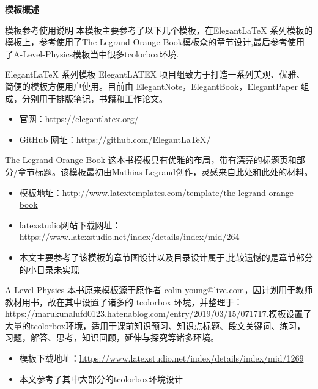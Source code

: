 
\frontmatter
\thispagestyle{empty}
\newpage
\begin{center}
	\textbf{\LARGE 模板概述}
\end{center}
\begin{ascolorbox5}{模板参考使用说明}
本模板主要参考了以下几个模板，在Elegant\LaTeX{} 系列模板的模板上，参考使用了The Legrand Orange Book模板众的章节设计,最后参考使用了A-Level-Physics模板当中很多tcolorbox环境.
\begin{ascboxB}{Elegant\LaTeX{} 系列模板}
ElegantLATEX 项目组致力于打造一系列美观、优雅、简便的模板方便用户使用。目前由
ElegantNote，ElegantBook，ElegantPaper 组成，分别用于排版笔记，书籍和工作论文。
\begin{itemize}
	\item 官网：\href{https://elegantlatex.org/}{https://elegantlatex.org/}
	\item GitHub 网址：\href{https://github.com/ElegantLaTeX/}{https://github.com/ElegantLaTeX/}
\end{itemize} 
\end{ascboxB}
\begin{ascboxB}{The Legrand Orange Book}
这本书模板具有优雅的布局，带有漂亮的标题页和部分/章节标题。该模板最初由Mathias Legrand创作，灵感来自此处和此处的材料。
\begin{itemize}
\item  模板地址：\href{http://www.latextemplates.com/template/the-legrand-orange-book}{http://www.latextemplates.com/template/the-legrand-orange-book}
\item  latexstudio网站下载网址：\href{https://www.latexstudio.net/index/details/index/mid/264}{https://www.latexstudio.net/index/details/index/mid/264}
\item 本文主要参考了该模板的章节图设计以及目录设计属于,比较遗憾的是章节部分的小目录未实现
\end{itemize} 
\end{ascboxB}
\begin{ascboxB}{A-Level-Physics}
本书原来模板源于原作者  \url{colin-young@live.com}，因计划用于教师教材用书，故在其中设置了诸多的 tcolorbox 环境，并整理于：\url{https://marukunalufd0123.hatenablog.com/entry/2019/03/15/071717}.模板设置了大量的tcolorbox环境，适用于课前知识预习、知识点标题、段文关键词、练习，习题，解答、思考，知识回顾，延伸与探究等诸多环境。
\begin{itemize}
	\item 模板下载地址：\href{https://www.latexstudio.net/index/details/index/mid/1269}{https://www.latexstudio.net/index/details/index/mid/1269}
	\item 本文参考了其中大部分的tcolorbox环境设计
\end{itemize} 	
\end{ascboxB}

\end{ascolorbox5}
